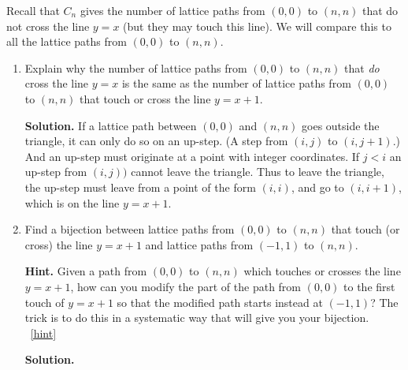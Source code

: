\documentclass{book}
\begin{document}
\setcounter{project}{182}
\addtocounter{project}{-1}
\begin{activity}[]\label{activity-175}
\hypertarget{p-1054}{}%
Recall that \(C_n\) gives the number of lattice paths from \((0,0)\) to \((n,n)\) that do not cross the line \(y = x\) (but they may touch this line).  We will compare this to all the lattice paths from \((0,0)\) to \((n,n)\).%
\begin{enumerate}[font=\bfseries,label=(\alph*),ref=\alph*]
\item\label{task-195} \hypertarget{p-1055}{}%
Explain why the number of lattice paths from \((0,0)\) to \((n,n)\) that \emph{do} cross the line \(y = x\) is the same as the number of lattice paths from \((0,0)\) to \((n,n)\) that touch or cross the line \(y = x + 1\).%
\par\smallskip%
\noindent\textbf{Solution.}\hypertarget{solution-95}{}\quad%
\hypertarget{p-1056}{}%
If a lattice path between \((0,0)\) and \((n,n)\) goes outside the triangle, it can only do so on an up-step. (A step from \((i,j)\) to \((i,j+1)\).) And an up-step must originate at a point with integer coordinates. If \(j\lt i\) an up-step from \((i,j))\) cannot leave the triangle. Thus to leave the triangle, the up-step must leave from a point of the form \((i,i)\), and go to \((i,i+1)\), which is on the line \(y=x+1\).%
\item\label{task-196} \hypertarget{p-1057}{}%
Find a bijection between lattice paths from \((0,0)\) to \((n,n)\) that touch (or cross) the line \(y=x+1\) and lattice paths from \((-1,1)\) to \((n,n)\).%
\par\smallskip%
\noindent\textbf{Hint.}\hypertarget{hint-122}{}\quad%
\hypertarget{p-1058}{}%
Given a path from \((0, 0)\) to \((n, n)\) which touches or crosses the line \(y = x + 1\), how can you modify the part of the path from \((0, 0)\) to the first touch of \(y = x + 1\) so that the modified path starts instead at \((-1, 1)\)? The trick is to do this in a systematic way that will give you your bijection.%
~\hfill{\tiny\hyperlink{a-182.b}{[hint]}\hypertarget{q-182.b}{}}\par\smallskip%
\noindent\textbf{Solution.}\hypertarget{solution-96}{}\quad%
\hypertarget{p-1059}{}%

\end{enumerate}
\end{activity}
\end{document}
